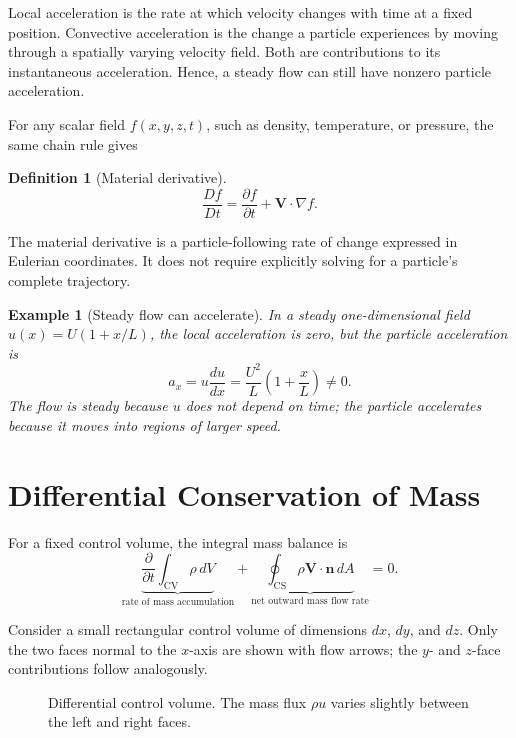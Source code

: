 \documentclass[11pt]{article}
\theoremstyle{plaincolon}
\theoremstyle{definitioncolon}
\newtheorem{definition}[theorem]{Definition}
\newtheorem{example}[theorem]{Example}
\theoremstyle{remarkcolon}
\numberwithin{equation}{section}
\begin{document}
Local acceleration is the rate at which velocity changes with time at a fixed position. Convective acceleration is the change a particle experiences by moving through a spatially varying velocity field. Both are contributions to its instantaneous acceleration. Hence, a steady flow can still have nonzero particle acceleration.

For any scalar field $f(x,y,z,t)$, such as density, temperature, or pressure, the same chain rule gives

\begin{definition}[Material derivative]
\[
\frac{Df}{Dt}=\frac{\partial f}{\partial t}+\mathbf V\cdot\nabla f.
\]
\end{definition}

The material derivative is a particle-following rate of change expressed in Eulerian coordinates. It does not require explicitly solving for a particle's complete trajectory.

\begin{example}[Steady flow can accelerate]
In a steady one-dimensional field $u(x)=U(1+x/L)$, the local acceleration is zero, but the particle acceleration is
\[
a_x=u\frac{du}{dx}
=\frac{U^2}{L}\left(1+\frac{x}{L}\right)\ne0.
\]
The flow is steady because $u$ does not depend on time; the particle accelerates because it moves into regions of larger speed.
\end{example}

\section{Differential Conservation of Mass}

For a fixed control volume, the integral mass balance is
\[
\underbrace{\frac{\partial}{\partial t}\int_{\mathrm{CV}}\rho\,dV}_{\text{rate of mass accumulation}}
+\underbrace{\oint_{\mathrm{CS}}\rho\mathbf V\cdot\mathbf n\,dA}_{\text{net outward mass flow rate}}=0.
\]

Consider a small rectangular control volume of dimensions $dx$, $dy$, and $dz$. Only the two faces normal to the $x$-axis are shown with flow arrows; the $y$- and $z$-face contributions follow analogously.

\begin{figure}[H]
\centering
{}
\caption{Differential control volume. The mass flux $\rho u$ varies slightly between the left and right faces.}
\end{figure}
\end{document}

